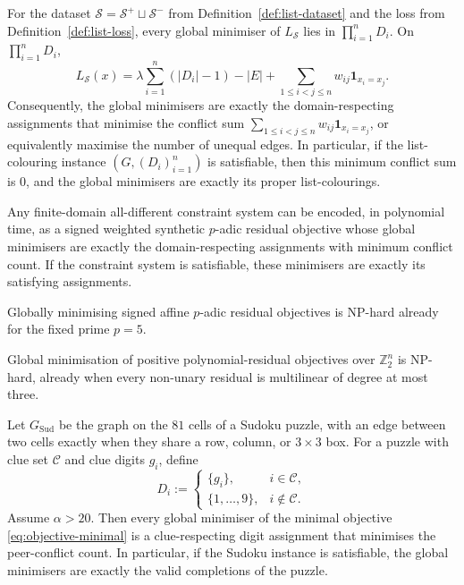 \begin{thm}
\label{thm:all-different}
For the dataset \(\mathcal S=\mathcal S^+\sqcup\mathcal S^-\) from Definition~\ref{def:list-dataset} and the loss from Definition~\ref{def:list-loss}, every global minimiser of \(L_{\mathcal S}\) lies in \(\prod_{i=1}^n D_i\). On \(\prod_{i=1}^n D_i\),
\[
L_{\mathcal S}(x)
=
\lambda\sum_{i=1}^n (|D_i|-1)
-|E|
+\sum_{1\le i<j\le n} w_{ij}\mathbf 1_{x_i=x_j}.
\]
Consequently, the global minimisers are exactly the domain-respecting assignments that minimise the conflict sum \(\sum_{1\le i<j\le n} w_{ij}\mathbf 1_{x_i=x_j}\), or equivalently maximise the number of unequal edges. In particular, if the list-colouring instance \((G,(D_i)_{i=1}^n)\) is satisfiable, then this minimum conflict sum is \(0\), and the global minimisers are exactly its proper list-colourings.
\end{thm}

\begin{corollary}
\label{cor:all-different-csp}
Any finite-domain all-different constraint system can be encoded, in polynomial time, as a signed weighted synthetic $p$-adic residual objective whose global minimisers are exactly the domain-respecting assignments with minimum conflict count. If the constraint system is satisfiable, these minimisers are exactly its satisfying assignments.
\end{corollary}

\begin{corollary}
\label{cor:signed-nphard}
Globally minimising signed affine \(p\)-adic residual objectives is NP-hard already for the fixed prime \(p=5\).
\end{corollary}

\begin{corollary}
\label{cor:sudoku-polynomial-dyadic-hardness}
Global minimisation of positive polynomial-residual objectives over \(\mathbb Z_2^n\) is NP-hard, already when every non-unary residual is multilinear of degree at most three.
\end{corollary}

\begin{corollary}
\label{cor:sudoku-special-case}
Let \(G_{\mathrm{Sud}}\) be the graph on the \(81\) cells of a Sudoku puzzle, with an edge between two cells exactly when they share a row, column, or \(3\times 3\) box. For a puzzle with clue set \(\mathcal{C}\) and clue digits \(g_i\), define
\[
D_i :=
\begin{cases}
\{g_i\}, & i\in \mathcal{C},\\
\{1,\dots,9\}, & i\notin \mathcal{C}.
\end{cases}
\]
Assume \(\alpha>20\). Then every global minimiser of the minimal objective \eqref{eq:objective-minimal} is a clue-respecting digit assignment that minimises the peer-conflict count. In particular, if the Sudoku instance is satisfiable, the global minimisers are exactly the valid completions of the puzzle.
\end{corollary}
